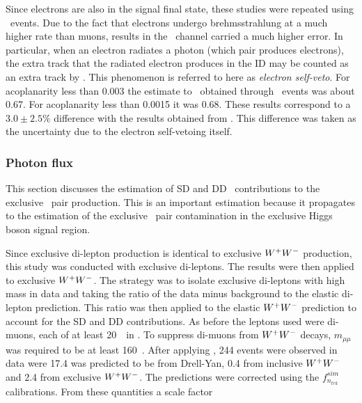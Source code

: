 \par Since electrons are also in the signal final state, these studies were repeated using 
\Zee\ events. Due to the fact that electrons undergo brehmsstrahlung at a much higher rate than 
muons, results in the \Zee\ channel carried a much higher error. In particular, when an electron 
radiates a photon (which pair produces electrons), the extra track that the radiated electron produces 
in the ID may be counted as an extra track by \DZ. This phenomenon is referred to here as 
{\it electron self-veto}. For acoplanarity less than 0.003 the estimate to \fEL\ obtained 
through \Zee\ events was about 0.67. For acoplanarity less than 0.0015 it was 0.68. These results 
correspond to a $3.0\pm 2.5\%$ difference with the results obtained from \Zmm. This difference was 
taken as the uncertainty due to the electron self-vetoing itself.   

\subsubsection{Photon flux}
\label{sec:flux}
\par This section discusses the estimation of SD and DD \Wpm\ contributions to the exclusive 
\Wpm\ pair production. This is an important estimation because it propagates to the estimation of 
the exclusive \Wpm\ pair contamination in the exclusive Higgs boson signal region.  

\par Since exclusive di-lepton production is identical to exclusive $W^+W^-$ production, 
this study was conducted with exclusive di-leptons. The results were then 
applied to exclusive $W^+W^-$. The strategy was to isolate exclusive di-leptons with high mass  
in data and taking the ratio of the data minus background to the elastic di-lepton prediction. 
This ratio was then applied to the elastic $W^+W^-$ prediction to account for the SD and DD contributions. 
As before the leptons used were di-muons, each of at least 20~\GeV\ in \pt. To suppress di-muons from 
$W^+W^-$ decays, $m_{\mu\mu}$ was required to be at least 160~\GeV. After applying \DZ, 244 events were 
observed in data were 17.4 was predicted to be from Drell-Yan, 0.4 from inclusive $W^+W^-$ and 2.4 from exclusive 
$W^+W^-$. The predictions were corrected using the $f^{sim}_{n_{trk}}$ calibrations. From these quantities a scale factor 

